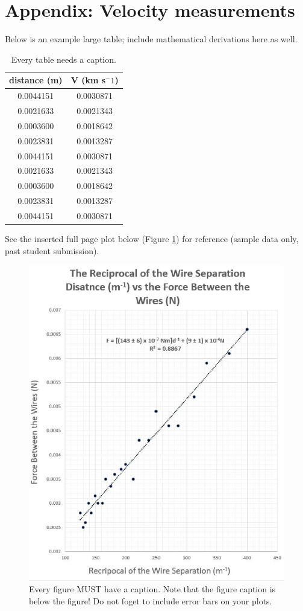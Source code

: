 \documentclass[letterpaper,11pt]{article}
\begin{document}
\section*{Appendix: Velocity measurements}

Below is an example large table; include mathematical derivations here as well.
\begin{table}[ht]
\begin{center}
\caption{Every table needs a caption.}
\label{table2} 
\begin{tabular}{cc} 
\hline
\multicolumn{1}{c}{distance (m)} & \multicolumn{1}{c}{V (km s$^-1$)} \\
\hline
0.0044151 &   0.0030871 \\
0.0021633 &   0.0021343 \\
0.0003600 &   0.0018642 \\
0.0023831 &   0.0013287 \\
0.0044151 &   0.0030871 \\
0.0021633 &   0.0021343 \\
0.0003600 &   0.0018642 \\
0.0023831 &   0.0013287 \\
0.0044151 &   0.0030871 \\
\hline
\end{tabular}
\end{center}
\end{table}

See the inserted full page plot below (Figure \ref{fig2}) for reference (sample data only, past student submission).

\begin{figure}[ht] 
        \centering \includegraphics[width=.9\columnwidth]{Capture}
        \caption{\label{fig2}Every figure MUST have a caption. Note that the figure caption is below the figure! Do not foget to include error bars on your plots.
        }
\end{figure}
\end{document}
